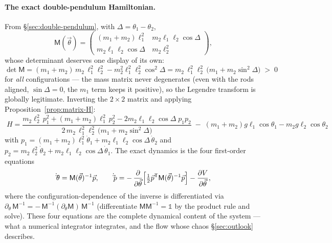 \documentclass[11pt]{article}
\theoremstyle{plain}
\theoremstyle{definition}
\theoremstyle{remark}
\newcommand{\pd}[2]{\frac{\partial #1}{\partial #2}}
\newcommand{\vp}{\vec{p}}
\newcommand{\vth}{\vec{\theta}}
\newcommand{\mM}{\mathsf{M}}
\begin{document}
\paragraph{The exact double-pendulum Hamiltonian.}
From \S\ref{sec:double-pendulum}, with $\Delta = \theta_1 - \theta_2$,
\begin{equation}
  \mM(\vth) =
  \begin{pmatrix}
    (m_1{+}m_2)\ell_1^2 & m_2\ell_1\ell_2\cos\Delta\\[2pt]
    m_2\ell_1\ell_2\cos\Delta & m_2\ell_2^2
  \end{pmatrix},
\end{equation}
whose determinant deserves one display of its own:
\begin{equation}
  \det\mM
  = (m_1{+}m_2)\,m_2\,\ell_1^2\ell_2^2
  - m_2^2\ell_1^2\ell_2^2\cos^2\Delta
  = m_2\,\ell_1^2\ell_2^2\,\bigl(m_1 + m_2\sin^2\Delta\bigr)
  \;>\; 0
\end{equation}
for \emph{all} configurations --- the mass matrix never degenerates (even
with the rods aligned, $\sin\Delta = 0$, the $m_1$ term keeps it
positive), so the Legendre transform is globally legitimate. Inverting
the $2\times2$ matrix and applying Proposition~\ref{prop:matrix-H}:
\begin{equation}
  \boxed{\;
  H = \frac{m_2\ell_2^2\,p_1^2 + (m_1{+}m_2)\ell_1^2\,p_2^2
      - 2m_2\ell_1\ell_2\cos\Delta\;p_1 p_2}
      {2\,m_2\,\ell_1^2\ell_2^2\,\bigl(m_1 + m_2\sin^2\Delta\bigr)}
  \;-\;(m_1{+}m_2)g\ell_1\cos\theta_1 - m_2g\ell_2\cos\theta_2
  \;}
  \label{eq:dp-H-exact}
\end{equation}
with $p_1 = (m_1{+}m_2)\ell_1^2\dot\theta_1 +
m_2\ell_1\ell_2\cos\Delta\,\dot\theta_2$ and
$p_2 = m_2\ell_2^2\dot\theta_2 + m_2\ell_1\ell_2\cos\Delta\,\dot\theta_1$.
The exact dynamics is the four first-order equations
\begin{equation}
  \dot\vth = \mM(\vth)^{-1}\vp,
  \qquad
  \dot\vp = -\,\pd{}{\vth}\Bigl[\tfrac12\vp^{\mathsf T}\mM(\vth)^{-1}\vp\Bigr]
  - \pd{V}{\vth},
\end{equation}
where the configuration-dependence of the inverse is differentiated via
$\partial_\theta\,\mM^{-1} = -\,\mM^{-1}(\partial_\theta\mM)\,\mM^{-1}$
(differentiate $\mM\mM^{-1} = \mathbb{1}$ by the product rule and solve).
These four equations are the complete dynamical content of the system ---
what a numerical integrator integrates, and the flow whose chaos
\S\ref{sec:outlook} describes.
\end{document}
